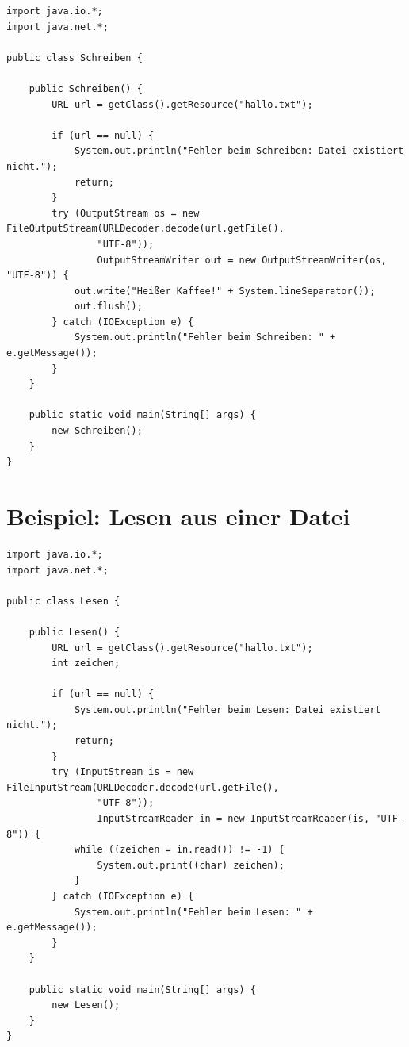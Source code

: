 \begin{lstlisting}
import java.io.*;
import java.net.*;

public class Schreiben {
	
    public Schreiben() {
        URL url = getClass().getResource("hallo.txt");

        if (url == null) {
            System.out.println("Fehler beim Schreiben: Datei existiert nicht.");
            return;
        }
        try (OutputStream os = new FileOutputStream(URLDecoder.decode(url.getFile(), 
                "UTF-8"));
                OutputStreamWriter out = new OutputStreamWriter(os, "UTF-8")) {
            out.write("Heißer Kaffee!" + System.lineSeparator());
            out.flush();
        } catch (IOException e) {
            System.out.println("Fehler beim Schreiben: " + e.getMessage());
        }
    }

    public static void main(String[] args) {
        new Schreiben();
    }
}
\end{lstlisting}


\section{Beispiel: Lesen aus einer Datei}

\begin{lstlisting}
import java.io.*;
import java.net.*;

public class Lesen {
	
    public Lesen() {
        URL url = getClass().getResource("hallo.txt");
        int zeichen;
	
        if (url == null) {
            System.out.println("Fehler beim Lesen: Datei existiert nicht.");
            return;
        }
        try (InputStream is = new FileInputStream(URLDecoder.decode(url.getFile(), 
                "UTF-8"));
                InputStreamReader in = new InputStreamReader(is, "UTF-8")) {
            while ((zeichen = in.read()) != -1) {
                System.out.print((char) zeichen);
            }
        } catch (IOException e) {
            System.out.println("Fehler beim Lesen: " + e.getMessage());
        }
    }

    public static void main(String[] args) {
        new Lesen();
    }
}
\end{lstlisting}
